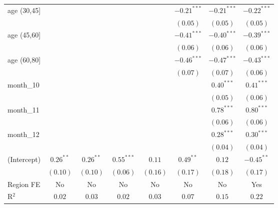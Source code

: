 \begin{table}
\begin{center}
\begin{tabular}{l c c c c c c c}
age (30,45]    &              &              &              &              & $-0.21^{***}$ & $-0.21^{***}$ & $-0.22^{***}$ \\
               &              &              &              &              & $(0.05)$      & $(0.05)$      & $(0.05)$      \\
age (45,60]    &              &              &              &              & $-0.41^{***}$ & $-0.40^{***}$ & $-0.39^{***}$ \\
               &              &              &              &              & $(0.06)$      & $(0.06)$      & $(0.06)$      \\
age (60,80]    &              &              &              &              & $-0.46^{***}$ & $-0.47^{***}$ & $-0.43^{***}$ \\
               &              &              &              &              & $(0.07)$      & $(0.07)$      & $(0.06)$      \\
month\_10      &              &              &              &              &               & $0.40^{***}$  & $0.41^{***}$  \\
               &              &              &              &              &               & $(0.05)$      & $(0.06)$      \\
month\_11      &              &              &              &              &               & $0.78^{***}$  & $0.80^{***}$  \\
               &              &              &              &              &               & $(0.06)$      & $(0.06)$      \\
month\_12      &              &              &              &              &               & $0.28^{***}$  & $0.30^{***}$  \\
               &              &              &              &              &               & $(0.04)$      & $(0.04)$      \\
(Intercept)    & $0.26^{**}$  & $0.26^{**}$  & $0.55^{***}$ & $0.11$       & $0.49^{**}$   & $0.12$        & $-0.45^{**}$  \\
               & $(0.10)$     & $(0.10)$     & $(0.06)$     & $(0.16)$     & $(0.17)$      & $(0.18)$      & $(0.17)$      \\
\hline
Region FE      & No           & No           & No           & No           & No            & No            & Yes           \\
R$^2$          & $0.02$       & $0.03$       & $0.02$       & $0.03$       & $0.07$        & $0.15$        & $0.22$        \\

\end{tabular}
\end{center}
\end{table}
